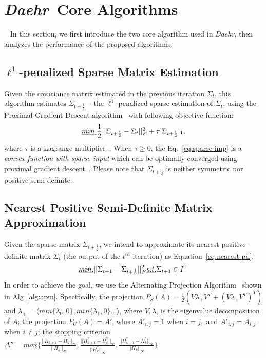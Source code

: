 \documentclass[journal,compsoc]{IEEEtran}
\newcommand{\TheName}{\mbox{\emph{Daehr}}}
\begin{document}
\section{\TheName\ Core Algorithms}~\label{sec:4}
In this section, we first introduce the two core algorithm used in \TheName, then analyzes the performance of the proposed algorithms.

\subsection{$\ell^1$-penalized Sparse Matrix Estimation}
Given the covariance matrix estimated in the previous iteration $\Sigma_{t}$, this algorithm estimates $\Sigma_{t+\frac{1}{2}}$ -- the $\ell^1$-penalized sparse estimation of $\Sigma_{t}$, using the Proximal Gradient Descent algorithm~\cite{nesterov2004introductory} with following objective function:   
\begin{equation}
\emph{min. }\frac{1}{2}||\Sigma_{t+\frac{1}{2}}-\Sigma_t||_F^2+\tau |\Sigma_{t+\frac{1}{2}}|_1,
\label{eq:sparse-imp}
\end{equation}
where $\tau$ is a Lagrange multiplier~\cite{wu2009karush}. When $\tau\geq 0$, the Eq.~\ref{eq:sparse-imp} is a \emph{convex function with sparse input} which can be optimally converged using proximal gradient descent~\cite{nesterov2004introductory}. Please note that $\Sigma_{t+\frac{1}{2}}$ is neither symmetric nor positive semi-definite.



\subsection{Nearest Positive Semi-Definite Matrix Approximation}
Given the sparse matrix $\Sigma_{t+\frac{1}{2}}$, we intend to approximate its nearest positive-definite matrix $\Sigma_{t}$ (the output of the $t^{th}$ iteration) as Equation~\ref{eq:nearest-pd}. 
%
\begin{equation}
\emph{min. } ||\Sigma_{t+1}-\Sigma_{t+\frac{1}{2}}||_F^2 \emph{ s.t. }\Sigma_{t+1}\in  {\bf }I^+
\label{eq:nearest-pd}
\end{equation}
%
In order to achieve the goal, we use the Alternating Projection Algorithm~\cite{higham2002computing} shown in Alg~\ref{alg:apm}. Specifically, the projection $P_S(A)=\frac{1}{2}(V\lambda_+V^T+(V\lambda_+V^T)^T)$ and  $\lambda_+=\langle min\{\lambda_0,0\},min\{\lambda_1,0\}\dots  \rangle$, where $V,\lambda_i$ is the eigenvalue decomposition of $A$; the projection $P_U(A)=A'$, where $A'_{i,j}=1$ when $i=j,$ and $A'_{i,j}=A_{i,j}$ when $i\neq j$; the stopping criterion $\Delta''=max\{\frac{||H_{k+1}-H_k||_\infty}{||H_k||_\infty}, \frac{||H_{k+1}^*-H_k^*||_\infty}{||H_k^*||_\infty}, \frac{||H_{k+1}^*-H_k^*||_\infty}{||H_k||_\infty}\}$.
\end{document}

